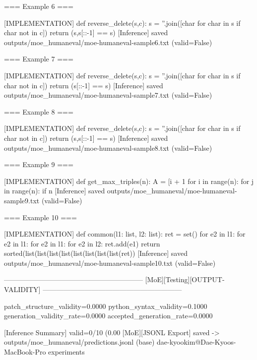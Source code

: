 === Example 6 ===

[IMPLEMENTATION]
def reverse_delete(s,c): s = ''.join([char for char in s if char not in c]) return (s,s[::-1] == s)
[Inference] saved outputs/moe_humaneval/moe-humaneval-sample6.txt (valid=False)

=== Example 7 ===

[IMPLEMENTATION]
def reverse_delete(s,c): s = ''.join([char for char in s if char not in c]) return (s[::-1] == s)
[Inference] saved outputs/moe_humaneval/moe-humaneval-sample7.txt (valid=False)

=== Example 8 ===

[IMPLEMENTATION]
def reverse_delete(s,c): s = ''.join([char for char in s if char not in c]) return (s,s[::-1] == s)
[Inference] saved outputs/moe_humaneval/moe-humaneval-sample8.txt (valid=False)

=== Example 9 ===

[IMPLEMENTATION]
def get_max_triples(n): A = [i + 1 for i in range(n): for j in range(n): if n%
[Inference] saved outputs/moe_humaneval/moe-humaneval-sample9.txt (valid=False)

=== Example 10 ===

[IMPLEMENTATION]
def common(l1: list, l2: list): ret = set() for e2 in l1: for e2 in l1: for e2 in l1: for e2 in l2: ret.add(e1) return sorted(list(list(list(list(list(list(list(list(ret))
[Inference] saved outputs/moe_humaneval/moe-humaneval-sample10.txt (valid=False)

------------------------------------------------------------
[MoE][Testing][OUTPUT-VALIDITY]
------------------------------------------------------------

patch_structure_validity=0.0000
python_syntax_validity=0.1000
generation_validity_rate=0.0000
accepted_generation_rate=0.0000

[Inference Summary] valid=0/10 (0.00%
[MoE][JSONL Export] saved -> outputs/moe_humaneval/predictions.jsonl
(base) dae-kyookim@Dae-Kyoos-MacBook-Pro experiments %